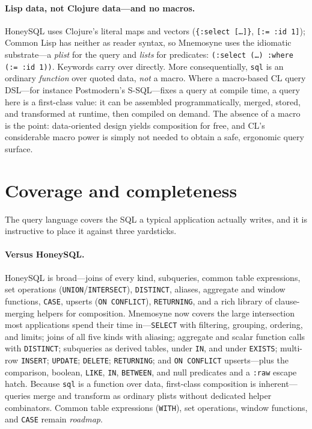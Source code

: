 \documentclass[11pt,a4paper]{article}
\begin{document}
\paragraph{Lisp data, not Clojure data---and no macros.} HoneySQL uses Clojure's literal
maps and vectors (\texttt{\{:select [\ldots]\}}, \texttt{[:= :id 1]}); Common Lisp has
neither as reader syntax, so Mnemosyne uses the idiomatic substrate---a \emph{plist} for the
query and \emph{lists} for predicates: \texttt{(:select (\ldots) :where (:= :id 1))}.
Keywords carry over directly. More consequentially, \texttt{sql} is an ordinary
\emph{function} over quoted data, \emph{not} a macro. Where a macro-based CL query DSL---for
instance Postmodern's S-SQL---fixes a query at compile time, a query here is a first-class
value: it can be assembled programmatically, merged, stored, and transformed at runtime,
then compiled on demand. The absence of a macro is the point: data-oriented design yields
composition for free, and CL's considerable macro power is simply not needed to obtain a
safe, ergonomic query surface.

\section{Coverage and completeness}
\label{sec:coverage}
The query language covers the SQL a typical application actually writes, and it is
instructive to place it against three yardsticks.

\paragraph{Versus HoneySQL.} HoneySQL is broad---joins of every kind, subqueries, common
table expressions, set operations (\texttt{UNION}/\texttt{INTERSECT}), \texttt{DISTINCT},
aliases, aggregate and window functions, \texttt{CASE}, upserts (\texttt{ON CONFLICT}),
\texttt{RETURNING}, and a rich library of clause-merging helpers for composition. Mnemosyne
now covers the large intersection most applications spend their time in---\texttt{SELECT}
with filtering, grouping, ordering, and limits; joins of all five kinds with aliasing;
aggregate and scalar function calls with \texttt{DISTINCT}; subqueries as derived tables,
under \texttt{IN}, and under \texttt{EXISTS}; multi-row \texttt{INSERT}; \texttt{UPDATE};
\texttt{DELETE}; \texttt{RETURNING}; and \texttt{ON CONFLICT} upserts---plus the comparison,
boolean, \texttt{LIKE}, \texttt{IN}, \texttt{BETWEEN}, and null predicates and a \texttt{:raw}
escape hatch. Because \texttt{sql} is a function over data, first-class composition is
inherent---queries merge and transform as ordinary plists without dedicated helper
combinators. Common table expressions (\texttt{WITH}), set operations, window functions, and
\texttt{CASE} remain \emph{roadmap}.
\end{document}
